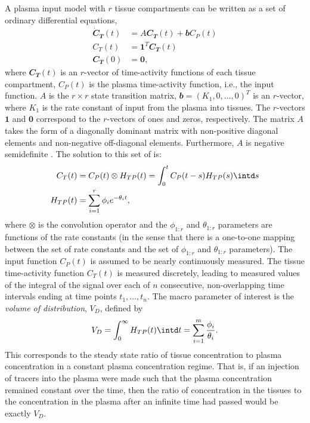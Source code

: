 A plasma input model with $r$ tissue compartments can be written as a set of
ordinary differential equations,
\begin{align*}
  \dot{\mathbfit{C}}_{\mathbfit{T}}(t)
  & = A \mathbfit{C}_{\mathbfit{T}}(t) + \mathbfit{b} C_P(t)\\
  C_T(t) & = \mathbf{1}^T\mathbfit{C}_{\mathbfit{T}}(t) \\
  \mathbfit{C}_{\mathbfit{T}}(0) & = \mathbf{0},
\end{align*}
where $\mathbfit{C}_{\mathbfit{T}}(t)$ is an $r$-vector of time-activity
functions of each tissue compartment, $C_P(t)$ is the plasma time-activity
function, i.e., the input function. $A$ is the $r \times r$ state transition
matrix, $\mathbfit{b} = (K_1, 0, \dots, 0)^T$ is an $r$-vector, where $K_1$ is
the rate constant of input from the plasma into tissues. The $r$-vectors
$\mathbf{1}$ and $\mathbf{0}$ correspond to the $r$-vectors of ones and zeros,
respectively. The matrix $A$ takes the form of a diagonally dominant matrix
with non-positive diagonal elements and non-negative off-diagonal elements.
Furthermore, $A$ is negative semidefinite \cite{Gunn:2001cx}. The solution to
this set of \ode is:
\begin{align}
  C_T(t) & = C_P(t) \otimes H_{TP}(t) = \int_0^t C_P(t-s) H_{TP}(s)\intd s
  \label{eq:CT} \\
  H_{TP}(t) & = \sum_{i=1}^r \phi_i e^{-\theta_i t},
\end{align}
where $\otimes$ is the convolution operator and the $\phi_{1:r}$ and
$\theta_{1:r}$ parameters are functions of the rate constants (in the sense
that there is a one-to-one mapping between the set of rate constants and the
set of $\phi_{1:r}$ and $\theta_{1:r}$ parameters). The input function
$C_P(t)$ is assumed to be nearly continuously measured. The tissue
time-activity function $C_T(t)$ is measured discretely, leading to measured
values of the integral of the signal over each of $n$ consecutive,
non-overlapping time intervals ending at time points $t_1, \dots, t_n$.  The
macro parameter of interest is the \emph{volume of distribution}, $V_D$,
defined by
\begin{equation}
  V_D = \int_0^{\infty} H_{TP}(t) \intd t = \sum_{i=1}^m
  \frac{\phi_i}{\theta_i}.
\end{equation}
This corresponds to the steady state ratio of tissue concentration to
plasma concentration in a constant plasma concentration regime. That is, if
an injection of tracers into the plasma were made such that the plasma
concentration remained constant over the time, then the ratio of
concentration in the tissues to the concentration in the plasma after an
infinite time had passed would be exactly $V_D$.


